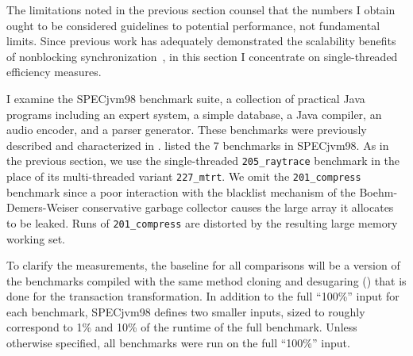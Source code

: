 The limitations noted in the previous
section counsel that the numbers I obtain ought to be considered
guidelines to potential performance, not fundamental limits.
Since previous work has adequately demonstrated the scalability
benefits of nonblocking
synchronization~\cite{LaMarca94,GreenwaldCh96,MassalinPu91,RajwarGo01,RajwarGo02,HammondWoCh04,AnanianAsKuLeLi05},
in this section I concentrate on single-threaded efficiency measures.

I examine the SPECjvm98 benchmark suite, a collection of
practical Java programs including an expert system, a simple database,
a Java compiler, an audio encoder, and a parser generator.  These
benchmarks were previously described and characterized in
.
 listed the 7 benchmarks in SPECjvm98.  As in the
previous section, we use the single-threaded {\tt 205\_raytrace} benchmark
in the place of its multi-threaded variant {\tt 227\_mtrt}.  We omit the
{\tt 201\_compress} benchmark since a poor
interaction with the blacklist mechanism of the Boehm-Demers-Weiser
conservative garbage collector causes the large array it allocates to
be leaked.  Runs of {\tt 201\_compress} are distorted by
the resulting large memory working set.

To clarify
the measurements, the baseline for all comparisons will be a
version of the benchmarks compiled with the same method cloning and
desugaring () that is done for the transaction
transformation.
In addition to the full ``100\%'' input for each benchmark,
SPECjvm98 defines two smaller inputs, sized to roughly correspond to
1\% and 10\% of the runtime of the full benchmark.  Unless otherwise
specified, all benchmarks were run on the full ``100\%'' input.


